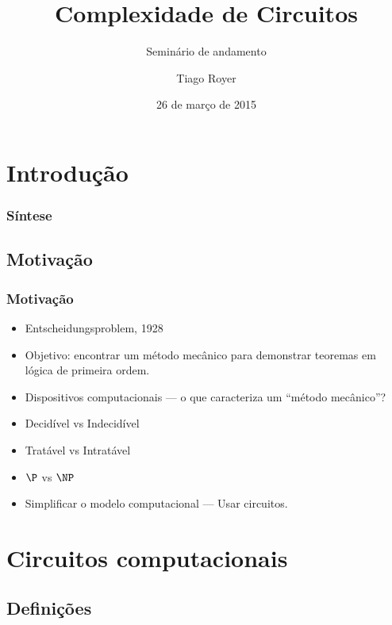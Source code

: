 \documentclass[utf8,notheorems]{beamer}
\theoremstyle{definition}
\begin{document}
\author{Tiago Royer}
\title{Complexidade de Circuitos}
\subtitle{Seminário de andamento}
\date{26 de março de 2015}
\begin{frame}
    \titlepage
\end{frame}

\section{Introdução}

\begin{frame}
    \frametitle{Síntese}
    \tableofcontents
\end{frame}

\subsection{Motivação}

\begin{frame}
    \frametitle{Motivação}
    \begin{itemize}
        \item Entscheidungsproblem, 1928
        \item Objetivo: encontrar um método mecânico
            para demonstrar teoremas em lógica de primeira ordem.
        \pause
        \item Dispositivos computacionais
            --- o que caracteriza um ``método mecânico''?
        \pause
        \item Decidível vs Indecidível
        \pause
        \item Tratável vs Intratável
        \pause
        \item $\P$ vs $\NP$
        \pause
        \item Simplificar o modelo computacional
            --- Usar circuitos.
    \end{itemize}
\end{frame}

\section{Circuitos computacionais}

\subsection{Definições}

\newcommand{\placenode}[1]{
    \node (x#1) at (2*#1, 0) {$x_#1$};
    \path (2*#1+0.5, 1) node[draw,circle] (neg#1) {$\neg$};
    \coordinate (p#1) at (2*#1 - 0.5, 2);
    \coordinate (n#1) at (2*#1 + 0.5, 2);
    \draw (x#1) -- (2*#1 - 0.5, 1) -- (p#1) -- (wp);
    \draw (x#1) -- (neg#1) -- (n#1) -- (wn);
}
\end{document}
